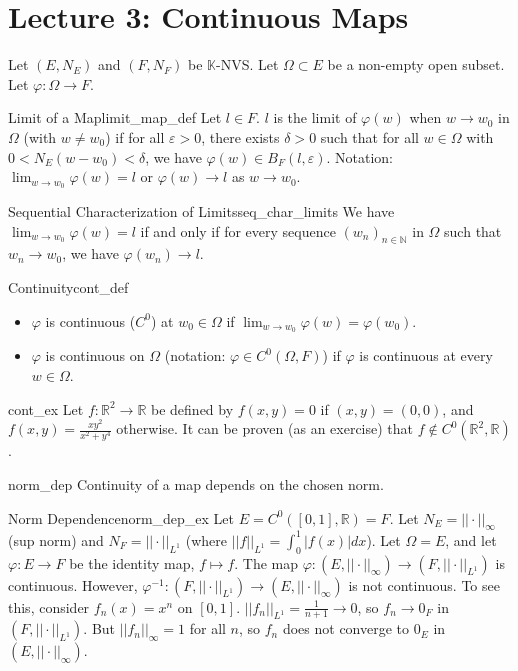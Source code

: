 \documentclass[11pt, a4paper]{article}
\newcommand{\R}{\mathbb{R}}
\newcommand{\N}{\mathbb{N}}
\newcommand{\eps}{\varepsilon}
\begin{document}
\section{Lecture 3: Continuous Maps}
Let $(E, N_E)$ and $(F, N_F)$ be $\mathbb{K}$-NVS. Let $\Omega \subset E$ be a non-empty open subset. Let $\varphi: \Omega \to F$.

\begin{definition}{Limit of a Map}{limit_map_def}
Let $l \in F$. $l$ is the limit of $\varphi(w)$ when $w \to w_0$ in $\Omega$ (with $w \neq w_0$) if for all $\eps > 0$, there exists $\delta > 0$ such that for all $w \in \Omega$ with $0 < N_E(w - w_0) < \delta$, we have $\varphi(w) \in B_F(l, \eps)$.
Notation: $\lim_{w \to w_0} \varphi(w) = l$ or $\varphi(w) \to l$ as $w \to w_0$.
\end{definition}

\begin{proposition}{Sequential Characterization of Limits}{seq_char_limits}
We have $\lim_{w \to w_0} \varphi(w) = l$ if and only if for every sequence $(w_n)_{n \in \N}$ in $\Omega$ such that $w_n \to w_0$, we have $\varphi(w_n) \to l$.
\end{proposition}

\begin{definition}{Continuity}{cont_def}
\begin{itemize}
    \item $\varphi$ is continuous ($C^0$) at $w_0 \in \Omega$ if $\lim_{w \to w_0} \varphi(w) = \varphi(w_0)$.
    \item $\varphi$ is continuous on $\Omega$ (notation: $\varphi \in C^0(\Omega, F)$) if $\varphi$ is continuous at every $w \in \Omega$.
\end{itemize}
\end{definition}

\begin{example}{}{cont_ex}
Let $f: \R^2 \to \R$ be defined by $f(x,y) = 0$ if $(x,y) = (0,0)$, and $f(x,y) = \frac{xy^2}{x^2+y^4}$ otherwise. It can be proven (as an exercise) that $f \notin C^0(\R^2, \R)$.
\end{example}

\begin{remark}{}{norm_dep}
Continuity of a map depends on the chosen norm.
\end{remark}
\begin{example}{Norm Dependence}{norm_dep_ex}
Let $E = C^0([0,1], \R) = F$.
Let $N_E = ||\cdot||_\infty$ (sup norm) and $N_F = ||\cdot||_{L^1}$ (where $||f||_{L^1} = \int_0^1 |f(x)|dx$).
Let $\Omega = E$, and let $\varphi: E \to F$ be the identity map, $f \mapsto f$.
The map $\varphi: (E, ||\cdot||_\infty) \to (F, ||\cdot||_{L^1})$ is continuous.
However, $\varphi^{-1}: (F, ||\cdot||_{L^1}) \to (E, ||\cdot||_\infty)$ is not continuous.
To see this, consider $f_n(x) = x^n$ on $[0,1]$.
$||f_n||_{L^1} = \frac{1}{n+1} \to 0$, so $f_n \to 0_F$ in $(F, ||\cdot||_{L^1})$.
But $||f_n||_\infty = 1$ for all $n$, so $f_n$ does not converge to $0_E$ in $(E, ||\cdot||_\infty)$.
\end{example}
\end{document}
